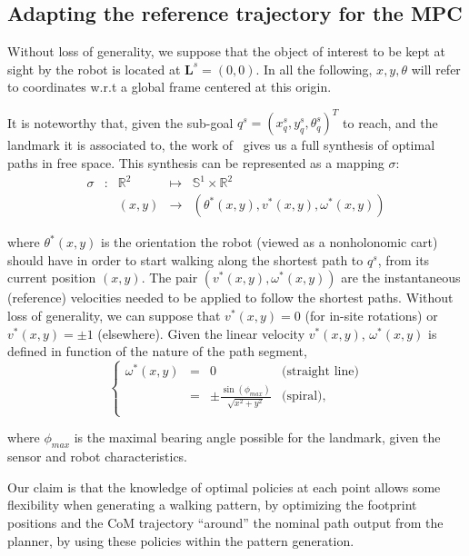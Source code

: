 \subsection{Adapting the reference trajectory for the MPC}

Without loss of generality, we suppose that the object of interest to be kept at sight by the robot is located at $\mathbf L^s = (0,0)$. In all the following, $x,y,\theta$ will refer to coordinates w.r.t a global frame centered at this origin.

It is noteworthy that, given the sub-goal $q^s =(x_q^s,y_q^s,\theta_q^s)^T$ to reach, and the landmark it is associated to, the work of~\cite{Salaris:2010} gives us a full synthesis of optimal paths in free space. This synthesis can be represented as a mapping $\sigma$:
$$
\begin{array}{cccccc}
\sigma & : & \mathbb{R}^2 & \mapsto & \mathbb{S}^1 \times \mathbb{R}^2\\
& & (x,y) & \rightarrow & (\theta^*(x,y),v^*(x,y),\omega^*(x,y))
\end{array}
$$

where $\theta^*(x,y)$ is the orientation the robot (viewed as a nonholonomic cart)  should have in order to start walking along the shortest path to $q^s$, from its current position $(x,y)$. The pair $(v^*(x,y),\omega^*(x,y))$ are the instantaneous (reference) velocities needed to be applied to follow the shortest paths. Without loss of generality, we can suppose that $v^*(x,y)=0$ (for in-site rotations) or $v^*(x,y)=\pm 1$ (elsewhere). Given the linear velocity $v^*(x,y)$, $\omega^*(x,y)$ is defined in function of the nature  of the path segment,
$$
\left\{
\begin{array}{cccc}
 \omega^*(x,y) & = & 0 & \mbox{(straight line)}\\
  & = & \pm\frac{\sin(\phi_{max})}{\sqrt{x^2+y^2}} & \mbox{(spiral)},\\
\end{array}
\right.
$$

where $\phi_{max}$ is the maximal bearing angle possible for the landmark, given the sensor and robot characteristics.

Our claim is that the knowledge of optimal policies at each point allows some flexibility when generating a walking pattern, by optimizing the footprint positions and  the CoM trajectory ``around'' the nominal path output from the planner, by using these policies within the pattern generation.

